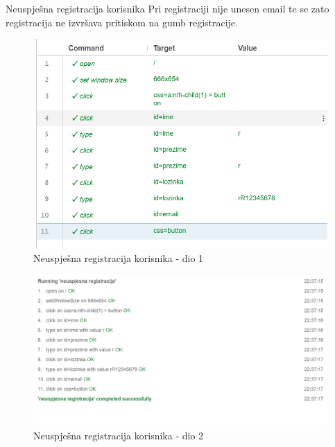 		   \item Neuspješna registracija korisnika
		   Pri registraciji nije unesen email te se zato registracija ne izvršava pritiskom na gumb registracije.
		   \begin{figure}[H]
		   	\includegraphics[scale=0.30]{slike/deploy/fTest3a.png}
		   	\centering
		   	\caption{Neuspješna registracija korisnika - dio 1}
		   	\label{fig:fTest3a}
		   \end{figure}
		   \begin{figure}[H]
		   	\includegraphics[scale=0.30]{slike/deploy/fTest3b.png}
		   	\centering
		   	\caption{Neuspješna registracija korisnika - dio 2}
		   	\label{fig:fTest3b}
		   \end{figure}
		   
		   \setcounter{enumi}{3}
		   
